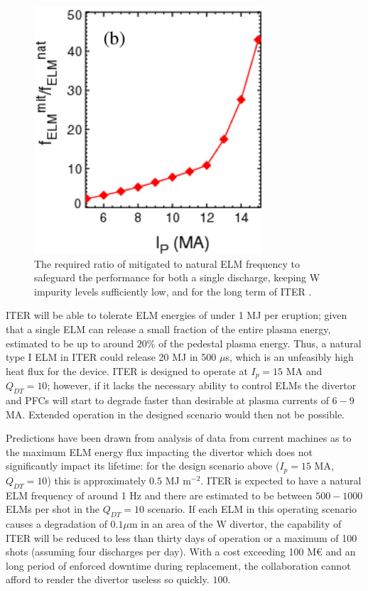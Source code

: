 \documentclass[12pt]{article}  %
\begin{document}
\begin{figure}
\includegraphics[scale=0.6]{Figures/FreqEnhance.png}
\centering
\caption{The required ratio of mitigated to natural ELM frequency to safeguard the performance for both a single discharge, keeping W impurity levels sufficiently low, and for the long term of ITER \cite{Kirk2013}.}\label{fig:FreqEnhance}
\end{figure}

ITER will be able to tolerate ELM energies of under 1 MJ per eruption; given that a single ELM can release a small fraction of the entire plasma energy, estimated to be up to around $20\%$ of the pedestal plasma energy\cite{Loarte2003}. Thus, a natural type I ELM in ITER could release 20 MJ in 500 $\mu$s\cite{KirkFF}, which is an unfeasibly high heat flux for the device. ITER is designed to operate at $I_p = 15$ MA and $Q_{DT} = 10$; however, if it lacks the necessary ability to control ELMs the divertor and PFCs will start to degrade faster than desirable at plasma currents of $6-9$ MA.\cite{Lang2013} Extended operation in the designed scenario would then not be possible.

Predictions have been drawn from analysis of data from current machines as to the maximum ELM energy flux impacting the divertor which does not significantly impact its lifetime: for the design scenario above ($I_p = 15$ MA, $Q_{DT} = 10$) this is approximately $0.5$ MJ m$^{-2}$\cite{LoarteTR2013}. ITER is expected to have a natural ELM frequency of around 1 Hz\cite{KirkFF} and there are estimated to be between $500-1000$ ELMs per shot in the $Q_{DT}=10$ scenario. If each ELM in this operating scenario causes a degradation of $0.1 \mu$m in an area of the W divertor, the capability of ITER will be reduced to less than thirty days of operation or a maximum of 100 shots\cite{Lang2013} (assuming four discharges per day). With a cost exceeding 100 M€ \cite{Tsitrone2013} and an long period of enforced downtime during replacement, the collaboration cannot afford to render the divertor useless so quickly. $100$.
\end{document}
